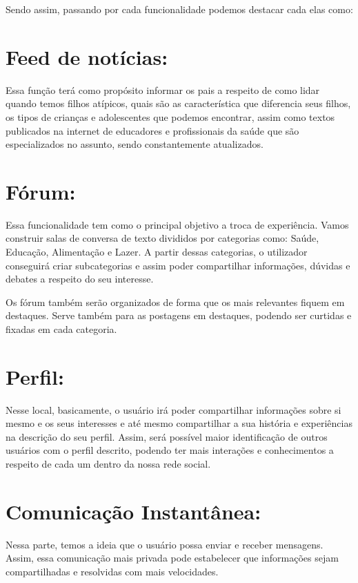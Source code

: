\begin{apendicesenv}
    Sendo assim, passando por cada funcionalidade podemos destacar cada elas como: 





\section{Feed de notícias:}
Essa função terá como propósito informar os pais a respeito de como lidar quando temos filhos atípicos, quais são as característica que diferencia seus filhos, os tipos de crianças e adolescentes que podemos encontrar, assim como textos publicados na internet de educadores e profissionais da saúde que são especializados no assunto, sendo constantemente atualizados. 

\section{Fórum:}
Essa funcionalidade tem como o principal objetivo a troca de experiência. Vamos construir salas de conversa de texto divididos por categorias como: Saúde, Educação, Alimentação e Lazer. A partir dessas categorias, o utilizador conseguirá criar subcategorias e assim poder compartilhar informações, dúvidas e debates a respeito do seu interesse.

Os fórum também serão organizados de forma que os mais relevantes fiquem em destaques. Serve também para as postagens em destaques, podendo ser curtidas e fixadas em cada categoria. 

\section{Perfil:}
Nesse local, basicamente, o usuário irá poder compartilhar informações sobre si mesmo e os seus interesses e até mesmo compartilhar a sua história e experiências na descrição do seu perfil. Assim, será possível maior identificação de outros usuários com o perfil descrito, podendo ter mais interações e conhecimentos a respeito de cada um dentro da nossa rede social. 

\section{Comunicação Instantânea: }
Nessa parte, temos a ideia que o usuário possa enviar e receber mensagens. Assim, essa comunicação mais privada pode estabelecer que informações sejam compartilhadas e resolvidas com mais velocidades. 


\end{apendicesenv}
